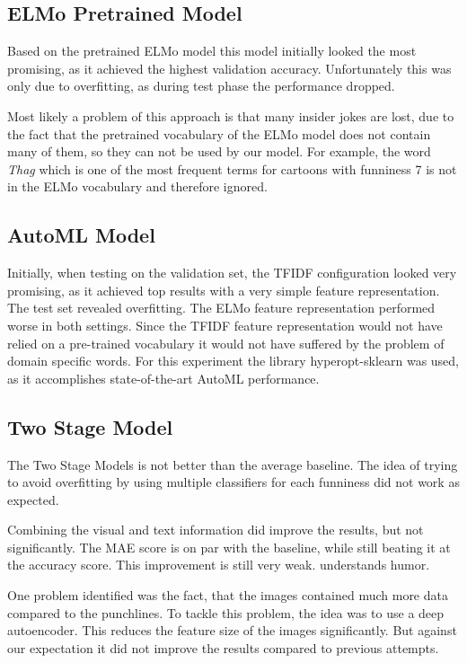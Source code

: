 \documentclass[draft,final,oneside]{vutinfth} %
\begin{document}
\subsection{ELMo Pretrained Model}

Based on the pretrained ELMo model this model initially looked the most promising, as it achieved the highest validation accuracy. Unfortunately this was only due to overfitting, as during test phase the performance dropped.

Most likely a problem of this approach is that many insider jokes are lost, due to the fact that the pretrained vocabulary of the ELMo model does not contain many of them, so they can not be used by our model. For example, the word \textit{Thag} which is one of the most frequent terms for cartoons with funniness 7 is not in the ELMo vocabulary and therefore ignored.

\subsection{AutoML Model}
Initially, when testing on the validation set, the TFIDF configuration looked very promising, as it achieved top results with a very simple feature representation. The test set revealed overfitting. The ELMo feature representation performed worse in both settings. Since the TFIDF feature representation would not have relied on a pre-trained vocabulary it would not have suffered by the problem of domain specific words. For this experiment the library hyperopt-sklearn \cite{hyperopt} was used, as it accomplishes state-of-the-art AutoML performance.

\subsection{Two Stage Model}
The Two Stage Models is not better than the average baseline. The idea of trying to avoid overfitting by using multiple classifiers for each funniness did not work as expected.

Combining the visual and text information did improve the results, but not significantly. The MAE score is on par with the baseline, while still beating it at the accuracy score. This improvement is still very weak.
understands humor.

One problem identified was the fact, that the images contained much more data compared to the punchlines. To tackle this problem, the idea was to use a deep autoencoder. This reduces the feature size of the images significantly. But against our expectation it did not improve the results compared to previous attempts.
\end{document}

